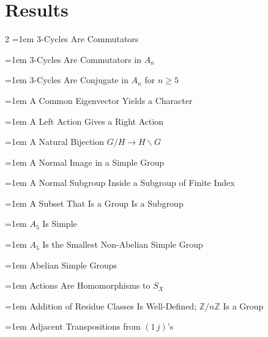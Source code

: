 \documentclass[11pt]{report}
\begin{document}
\section*{Results}
{}
\begin{multicols}{2}\raggedcolumns\small\setlength{\parskip}{1pt}
\noindent\hangindent=1em $3$-Cycles Are Commutators\dotfill \pageref{prop:3-cycles-commutators}\par
\noindent\hangindent=1em $3$-Cycles Are Commutators in $A_n$\dotfill \pageref{lem:3-cycles-commutators-an}\par
\noindent\hangindent=1em $3$-Cycles Are Conjugate in $A_n$ for $n \geq 5$\dotfill \pageref{lem:3-cycles-conjugate-an-n-ge-5}\par
\noindent\hangindent=1em A Common Eigenvector Yields a Character\dotfill \pageref{thm:common-eigenvector-yields-character}\par
\noindent\hangindent=1em A Left Action Gives a Right Action\dotfill \pageref{prop:left-action-gives-right-action}\par
\noindent\hangindent=1em A Natural Bijection $G/H \to H\backslash G$\dotfill \pageref{prop:natural-bijection-g-h-to-h-g}\par
\noindent\hangindent=1em A Normal Image in a Simple Group\dotfill \pageref{cor:normal-image-simple-group}\par
\noindent\hangindent=1em A Normal Subgroup Inside a Subgroup of Finite Index\dotfill \pageref{thm:normal-subgroup-inside-subgroup-finite-index}\par
\noindent\hangindent=1em A Subset That Is a Group Is a Subgroup\dotfill \pageref{prop:subset-group-subgroup}\par
\noindent\hangindent=1em $A_5$ Is Simple\dotfill \pageref{prop:a5-simple}\par
\noindent\hangindent=1em $A_5$ Is the Smallest Non-Abelian Simple Group\dotfill \pageref{thm:a5-smallest-non-abelian-simple-group}\par
\noindent\hangindent=1em Abelian Simple Groups\dotfill \pageref{thm:abelian-simple-groups}\par
\noindent\hangindent=1em Actions Are Homomorphisms to $S_X$\dotfill \pageref{thm:actions-homomorphisms-sx}\par
\noindent\hangindent=1em Addition of Residue Classes Is Well-Defined; $\mathbb{Z}/n\mathbb{Z}$ Is a Group\dotfill \pageref{prop:addition-residue-classes-well-defined-z-nz-group}\par
\noindent\hangindent=1em Adjacent Transpositions from $(1\,j)$'s\dotfill \pageref{lem:adjacent-transpositions-1-j-s}\par

\end{multicols}
\end{document}
